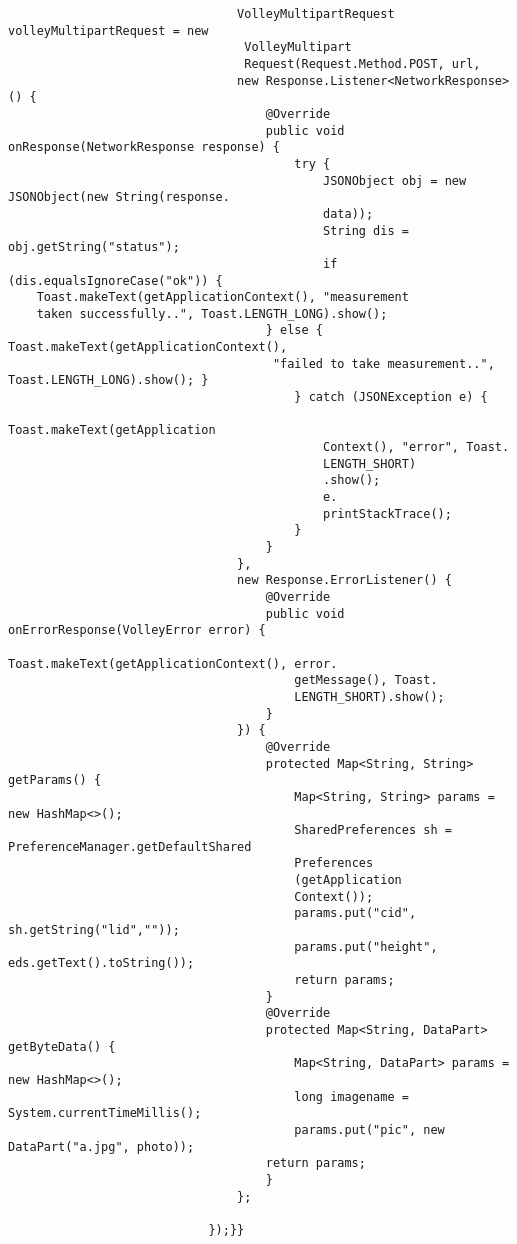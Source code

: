 \documentclass[a4paper,12pt,toc=flat]{report}
\begin{document}
{{{{\begin{itemize}
\begin{verbatim}
 								VolleyMultipartRequest volleyMultipartRequest = new
 								 VolleyMultipart
 								 Request(Request.Method.POST, url,
 								new Response.Listener<NetworkResponse>() {
 									@Override
 									public void onResponse(NetworkResponse response) {
 										try {
 											JSONObject obj = new JSONObject(new String(response.
 											data));
 											String dis = obj.getString("status");
 											if (dis.equalsIgnoreCase("ok")) {
   	Toast.makeText(getApplicationContext(), "measurement 
   	taken successfully..", Toast.LENGTH_LONG).show();
 									} else {	Toast.makeText(getApplicationContext(),
 									 "failed to take measurement..", Toast.LENGTH_LONG).show();	}
 										} catch (JSONException e) {
 											Toast.makeText(getApplication
 											Context(), "error", Toast.
 											LENGTH_SHORT)
 											.show();
 											e.
 											printStackTrace();
 										}
 									}
 								},
 								new Response.ErrorListener() {
 									@Override
 									public void onErrorResponse(VolleyError error) {
 										Toast.makeText(getApplicationContext(), error.
 										getMessage(), Toast.
 										LENGTH_SHORT).show();
 									}
 								}) {
 									@Override
 									protected Map<String, String> getParams() {
 										Map<String, String> params = new HashMap<>();
 										SharedPreferences sh = PreferenceManager.getDefaultShared
 										Preferences
 										(getApplication
 										Context());
 										params.put("cid", sh.getString("lid",""));
 										params.put("height", eds.getText().toString());
 										return params;
 									}	
 									@Override
 									protected Map<String, DataPart> getByteData() {
 										Map<String, DataPart> params = new HashMap<>();
 										long imagename = System.currentTimeMillis();
 										params.put("pic", new DataPart("a.jpg", photo));
 									return params;
 									}
 								};
 								
 							});}}
 			\end{verbatim}
 		\pagebreak
 			

\end{itemize}}}}}
\end{document}
